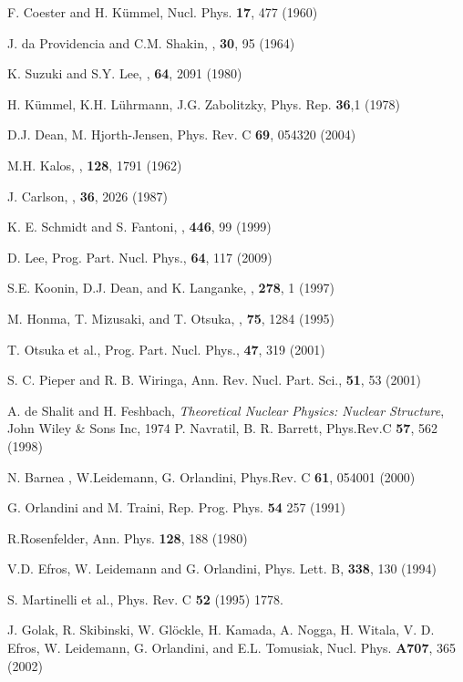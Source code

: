 \begin{thebibliography}{00}
 F. Coester and H. K{\" u}mmel, Nucl. Phys.  {\bf 17}, 477 (1960)

 J. da Providencia and C.M. Shakin, \ANNP, {\bf 30}, 95 (1964) 

 K. Suzuki and S.Y. Lee, \PRO, {\bf 64},  2091  (1980)

 H. K\"ummel, K.H. L\"uhrmann, J.G. Zabolitzky, Phys. Rep. {\bf 36},1 (1978) 

 D.J. Dean, M. Hjorth-Jensen, Phys. Rev. C  {\bf 69}, 054320 (2004) 

 M.H. Kalos,  \PREV,  {\bf 128},  1791 (1962) 

 J. Carlson,  \PRC,  {\bf 36},  2026   (1987) 

 K. E. Schmidt and S. Fantoni,  \PLB,  {\bf 446},  99  (1999) 

 D. Lee,   Prog. Part. Nucl. Phys., {\bf 64}, 117 (2009)

 S.E. Koonin, D.J. Dean, and K. Langanke,  \PREP, {\bf 278}, 1 (1997)

 M. Honma, T. Mizusaki, and T. Otsuka,  \PRL,  {\bf 75}, 1284 (1995)

 T. Otsuka et al.,  Prog. Part. Nucl. Phys., {\bf 47},  319 (2001)

 S. C. Pieper and R. B. Wiringa, Ann. Rev. Nucl. Part. Sci., {\bf 51}, 53 (2001)

 A. de Shalit and H. Feshbach, {\it Theoretical Nuclear Physics: Nuclear Structure}, 
               John Wiley \& Sons Inc, 1974                
 P. Navratil, B. R. Barrett, Phys.Rev.C {\bf 57}, 562 (1998) 

N. Barnea , W.Leidemann, G. Orlandini, Phys.Rev. C {\bf 61}, 054001 (2000)

 G. Orlandini and M. Traini, Rep. Prog. Phys. {\bf 54} 257 (1991) 

 R.Rosenfelder, Ann. Phys. {\bf 128}, 188 (1980)

 V.D. Efros, W. Leidemann  and G. Orlandini, Phys. Lett. B, {\bf 338}, 130 (1994)

 S. Martinelli et al., Phys. Rev. C {\bf 52} (1995) 1778.

 J. Golak, R. Skibinski, W. Gl\"ockle, H. Kamada, A. Nogga, 
H. Witala, V. D. Efros, W. Leidemann, G. Orlandini, and E.L. Tomusiak, 
Nucl. Phys. {\bf A707}, 365 (2002)
  

\end{thebibliography}
